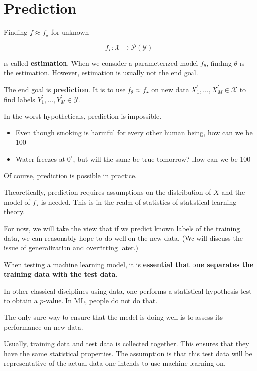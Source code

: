 \documentclass{report}
\begin{document}
\section{Prediction}

\begin{definition}
    Finding $f \approx f_{\star}$ for unknown

    $$
    f_{\star}: \mathcal{X} \rightarrow \mathcal{P}(\mathcal{Y})
    $$

    is called \textbf{estimation}. When we consider a parameterized model $f_{\theta}$, finding $\theta$ is the estimation. However, estimation is usually not the end goal.

    The end goal is \textbf{prediction}. It is to use $f_{\theta} \approx f_{\star}$ on new data $X_{1}^{\prime}, \ldots, X_{M}^{\prime} \in \mathcal{X}$ to find labels $Y_{1}^{\prime}, \ldots, Y_{M}^{\prime} \in \mathcal{Y}$.
\end{definition}

\begin{concept}
    In the worst hypotheticals, prediction is impossible.

    \begin{itemize}
        \item Even though smoking is harmful for every other human being, how can we be 100%
        \item Water freezes at $0^{\circ}$, but will the same be true tomorrow? How can we be 100%
    \end{itemize}

    Of course, prediction is possible in practice.

    Theoretically, prediction requires assumptions on the distribution of $X$ and the model of $f_{\star}$ is needed. This is in the realm of statistics of statistical learning theory.

    For now, we will take the view that if we predict known labels of the training data, we can reasonably hope to do well on the new data. (We will discuss the issue of generalization and overfitting later.)
\end{concept}

\begin{concept}
    When testing a machine learning model, it is \textbf{essential that one separates the training data with the test data}.

    In other classical disciplines using data, one performs a statistical hypothesis test to obtain a $p$-value. In ML, people do not do that.

    The only sure way to ensure that the model is doing well is to assess its performance on new data.

    Usually, training data and test data is collected together. This ensures that they have the same statistical properties. The assumption is that this test data will be representative of the actual data one intends to use machine learning on.
\end{concept}
\end{document}
